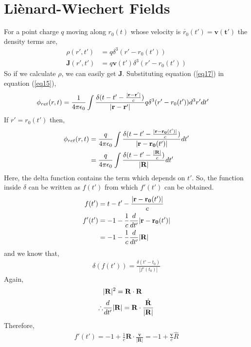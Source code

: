\documentclass[11pt,a4paper]{article}
\begin{document}
\section*{Li\`enard-Wiechert Fields}
For a point charge $q$ moving along $r_0(t)$ whose velocity is $\dot{r_0}(t') = \mathbf{v(t')}$ the density terms are,
\begin{align}
    \rho(r', t') &= q\delta^3(r' - r_0(t')) \label{eq17} \\
    \mathbf{J}(r', t') &= q\mathbf{v}(t')\delta^3(r' - r_0(t')) \label{eq18}
\end{align}
So if we calculate $\rho$, we can easily get $\mathbf{J}$. Substituting equation (\ref{eq17}) in equation (\ref{eq15}),
\begin{align}
    \phi_{ret}(r,t) &= \frac{1}{4\pi \epsilon_0} \int \frac{\delta (t - t' -\frac{|\mathbf{r} - \mathbf{r'|}}{c})}{|\mathbf{r} - \mathbf{r'}|}  q\delta^3(r' - r_0(t'))d^3r'dt' \notag
\end{align}
If $r' = r_0(t')$ then, 
\begin{align}
        \phi_{ret}(r,t) &= \frac{q}{4\pi \epsilon_0} \int \frac{\delta (t - t' -\frac{|\mathbf{r} - \mathbf{r_0}(t')|}{c})}{|\mathbf{r} - \mathbf{r_0}(t')|} dt' \notag \\
        &=  \frac{q}{4\pi \epsilon_0} \int \frac{\delta (t - t' -\frac{|\mathbf{R}|}{c})}{|\mathbf{R}|} dt' \label{eq19}
\end{align}
Here, the delta function contains the term which depends on $t'$. So, the function inside $\delta$ can be written as $f(t')$ from which
$f'(t')$ can be obtained.
\begin{align}
    f(t') &= t - t' - \frac{|\mathbf{r}-\mathbf{r_0}(t')|}{c} \notag \\
    f'(t') & = -1 - \frac{1}{c} \frac{d}{dt'}|\mathbf{r} - \mathbf{r_0}(t')| \notag \\
           & = -1 - \frac{1}{c} \frac{d}{dt'}|\mathbf{R}| \label{eq20}
\end{align}
and we know that,
\begin{align}
    \delta(f(t')) = \frac{\delta(t' - t_0)}{|f'(t_0)|} \label{eq21}
\end{align}
Again,
\begin{align}
    & |\mathbf{R}|^2 = \mathbf{R}\cdot \mathbf{R} \notag \\
    \therefore & \frac{d}{dt'}|\mathbf{R}| = \mathbf{R}\cdot \frac{\dot{\mathbf{R}}}{|\mathbf{R}|} \label{eq22} 
\end{align}
Therefore,
\begin{align}
    f'(t') = -1 + \frac{1}{c}\mathbf{R} \cdot \frac{\mathbf{v}}{|\mathbf{R}|} = -1 + \frac{\mathbf{v}}{c}\hat{R} \label{eq23}
\end{align}
\end{document}
